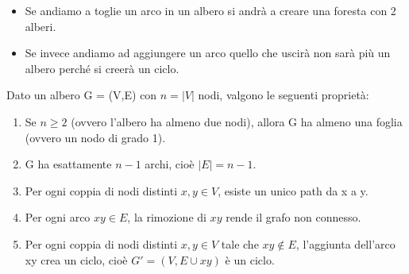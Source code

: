 \begin{itemize}
    \item Se andiamo a toglie un arco in un albero si andrà a creare una foresta con 2 alberi.
    \item Se invece andiamo ad aggiungere un arco quello che uscirà non sarà più un albero perché si creerà un ciclo.
\end{itemize}

\begin{proposition}
    Dato un albero G = (V,E) con $n = |V|$ nodi, valgono le seguenti proprietà:
    \begin{enumerate}
        \item Se $n \geq 2$ (ovvero l'albero ha almeno due nodi), allora G ha almeno una foglia (ovvero un nodo di grado 1).
        \item G ha esattamente $n-1$ archi, cioè $|E| = n-1$.
        \item Per ogni coppia di nodi distinti $x,y \in V$, esiste un unico path da x a y.
        \item Per ogni arco $xy \in E$, la rimozione di $xy$ rende il grafo non connesso.
        \item Per ogni coppia di nodi distinti $x,y \in V$ tale che $xy \notin E$, l'aggiunta dell'arco xy crea un ciclo, cioè $G' = (V, E \cup {xy})$ è un ciclo.
    \end{enumerate}
\end{proposition}

